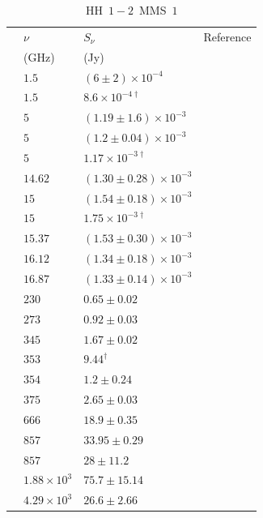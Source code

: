 \documentclass[9pt]{extarticle}   	%
\begin{document}
\begin{table}
\caption{HH~$1-2$~MMS~$1$}
\begin{center}
\begin{tabular}{llll}
\hline
 & $\nu$ & $S_\nu$ & Reference\\
 & (GHz) & (Jy) & \\
\hline
 & $1.5$ & $(6\pm2)\times10^{-4}$ & \citet{1985ApJ...293L..35P}\\
 & $1.5$ & $8.6\times10^{-4\dag}$ & \citet{1990ApJ...352..645R}\\
 & $5$ & $(1.19\pm1.6)\times10^{-3}$ & \citet{1990ApJ...362..274M}\\
 & $5$ & $(1.2\pm0.04)\times10^{-3}$ & \citet{1985ApJ...293L..35P}\\
 & $5$ & $1.17\times10^{-3\dag}$ & \citet{1990ApJ...352..645R}\\
 & $14.62$ & $(1.30\pm0.28)\times10^{-3}$ & \citet{2012MNRAS.423.1089A}\\
 & $15$ & $(1.54\pm0.18)\times10^{-3}$ & \citet{1985ApJ...293L..35P}\\
 & $15$ & $1.75\times10^{-3\dag}$ & \citet{1990ApJ...352..645R}\\
 & $15.37$ & $(1.53\pm0.30)\times10^{-3}$ & \citet{2012MNRAS.423.1089A}\\
 & $16.12$ & $(1.34\pm0.18)\times10^{-3}$ & \citet{2012MNRAS.423.1089A}\\
 & $16.87$ & $(1.33\pm0.14)\times10^{-3}$ & \citet{2012MNRAS.423.1089A}\\
 & $230$ & $0.65\pm0.02$ & \citet{1993AA...273..221R}\\
 & $273$ & $0.92\pm0.03$ & \citet{1998MNRAS.301.1049D}\\
 & $345$ & $1.67\pm0.02$ & \citet{1993AA...273..221R}\\
 & $353$ & $9.44^{\dag}$ & \citet{2008ApJS..175..277D}\\
 & $354$ & $1.2\pm0.24$ & \citet{2010AA...518L.122F}\\
 & $375$ & $2.65\pm0.03$ & \citet{1998MNRAS.301.1049D}\\
 & $666$ & $18.9\pm0.35$ & \citet{1998MNRAS.301.1049D}\\
 & $857$ & $33.95\pm0.29$ & \citet{1998MNRAS.301.1049D}\\
 & $857$ & $28\pm11.2$ & \citet{2010AA...518L.122F}\\
 & $1.88\times10^{3}$ & $75.7\pm15.14$ & \citet{2010AA...518L.122F}\\
 & $4.29\times10^{3}$ & $26.6\pm2.66$ & \citet{2010AA...518L.122F}\\
\end{tabular}
\end{center}
\label{default}
\end{table}%
\end{document}
